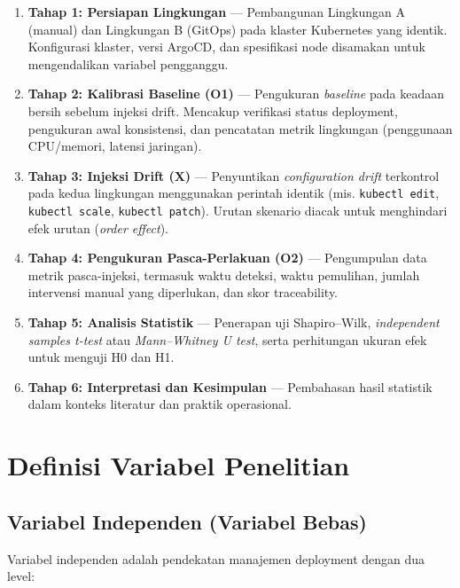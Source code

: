 \begin{enumerate}
    \item \textbf{Tahap 1: Persiapan Lingkungan} --- Pembangunan Lingkungan A (manual) dan Lingkungan B (GitOps) pada klaster Kubernetes yang identik. Konfigurasi klaster, versi ArgoCD, dan spesifikasi node disamakan untuk mengendalikan variabel pengganggu.
    
    \item \textbf{Tahap 2: Kalibrasi Baseline (O1)} --- Pengukuran \textit{baseline} pada keadaan bersih sebelum injeksi drift. Mencakup verifikasi status deployment, pengukuran awal konsistensi, dan pencatatan metrik lingkungan (penggunaan CPU/memori, latensi jaringan).
    
    \item \textbf{Tahap 3: Injeksi Drift (X)} --- Penyuntikan \textit{configuration drift} terkontrol pada kedua lingkungan menggunakan perintah identik (mis. \texttt{kubectl edit}, \texttt{kubectl scale}, \texttt{kubectl patch}). Urutan skenario diacak untuk menghindari efek urutan (\textit{order effect}).
    
    \item \textbf{Tahap 4: Pengukuran Pasca-Perlakuan (O2)} --- Pengumpulan data metrik pasca-injeksi, termasuk waktu deteksi, waktu pemulihan, jumlah intervensi manual yang diperlukan, dan skor traceability.
    
    \item \textbf{Tahap 5: Analisis Statistik} --- Penerapan uji Shapiro--Wilk, \textit{independent samples t-test} atau \textit{Mann--Whitney U test}, serta perhitungan ukuran efek untuk menguji H0 dan H1.
    
    \item \textbf{Tahap 6: Interpretasi dan Kesimpulan} --- Pembahasan hasil statistik dalam konteks literatur dan praktik operasional.
\end{enumerate}

\section{Definisi Variabel Penelitian}

\subsection{Variabel Independen (Variabel Bebas)}

Variabel independen adalah pendekatan manajemen deployment dengan dua level:

